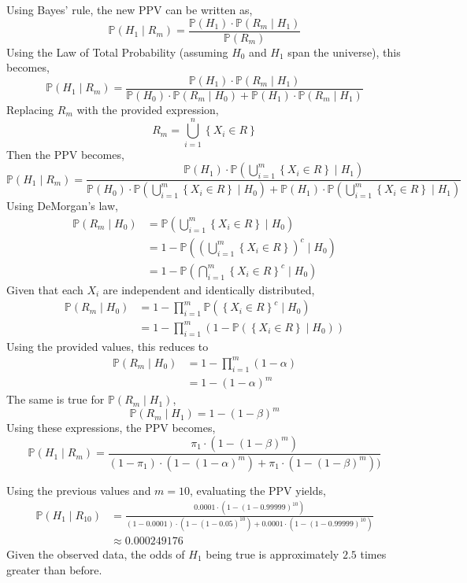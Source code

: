 \documentclass[12pt,twoside]{article}
\begin{document}
\begin{problems}
\begin{problemparts}
Using Bayes' rule, the new PPV can be written as,
$$ \mathbb{P}(H_1 \mid R_m) = \frac{\mathbb{P}(H_1) \cdot \mathbb{P}(R_m \mid
H_1)}{\mathbb{P}(R_m)} $$
Using the Law of Total Probability (assuming $H_0$ and $H_1$ span the
universe), this becomes,
$$ \mathbb{P}(H_1 \mid R_m) = \frac{\mathbb{P}(H_1) \cdot \mathbb{P}(R_m \mid
H_1)}{\mathbb{P}(H_0) \cdot \mathbb{P}(R_m \mid H_0) + \mathbb{P}(H_1) \cdot
\mathbb{P}(R_m \mid H_1)} $$
Replacing $R_m$ with the provided expression,
$$ R_m = \bigcup_{i = 1}^n \left\{X_i \in R\right\} $$
Then the PPV becomes,
$$ \mathbb{P}(H_1 \mid R_m) = \frac{\mathbb{P}(H_1) \cdot
\mathbb{P}(\bigcup_{i = 1}^m \left\{X_i \in R\right\} \mid
H_1)}{\mathbb{P}(H_0) \cdot \mathbb{P}(\bigcup_{i = 1}^m \left\{X_i \in
R\right\} \mid H_0) + \mathbb{P}(H_1) \cdot \mathbb{P}(\bigcup_{i = 1}^m
\left\{X_i \in R\right\} \mid H_1)} $$
Using DeMorgan's law, 
\begin{align*}
    \mathbb{P}\left(R_m \mid H_0\right) &= \mathbb{P}\left(\bigcup_{i = 1}^m
    \left\{X_i \in R\right\} \mid H_0\right) \\
    &= 1 - \mathbb{P}\left(\left(\bigcup_{i = 1}^m \left\{X_i \in
    R\right\}\right)^c \mid H_0\right) \\
    &= 1 - \mathbb{P}\left(\bigcap_{i = 1}^m \left\{X_i \in R\right\}^c \mid
    H_0\right)
\end{align*}
Given that each $X_i$ are independent and identically distributed, 
\begin{align*}
    \mathbb{P}\left(R_m \mid H_0\right) &= 1 - \prod_{i = 1}^m
    \mathbb{P}\left(\left\{X_i \in R\right\}^c \mid H_0\right) \\
    &= 1 - \prod_{i = 1}^m \left(1 - \mathbb{P}\left(\left\{X_i \in R\right\}
    \mid H_0\right)\right)
\end{align*}
Using the provided values, this reduces to
\begin{align*}
    \mathbb{P}\left(R_m \mid H_0\right) &= 1 - \prod_{i = 1}^m \left(1 -
    \alpha\right) \\
    &= 1 - (1 - \alpha)^m
\end{align*}
The same is true for $\mathbb{P}(R_m \mid H_1)$,
$$ \mathbb{P}(R_m \mid H_1) = 1 - (1 - \beta)^m $$
Using these expressions, the PPV becomes,
$$ \mathbb{P}(H_1 \mid R_m) = \boxed{\frac{\pi_1 \cdot \left(1 - (1 -
\beta)^m\right)}{(1 - \pi_1) \cdot \left(1 - (1 - \alpha)^m\right) + \pi_1
\cdot \left(1 - (1 - \beta)^m\right))}} $$

\problempart  %

Using the previous values and $m = 10$, evaluating the PPV yields,
\begin{align*}
    \mathbb{P}(H_1 \mid R_{10}) &= \frac{0.0001 \cdot (1 - (1 -
    0.99999)^{10})}{(1 - 0.0001) \cdot (1 - (1 - 0.05)^{10}) + 0.0001 \cdot
    (1 - (1 - 0.99999)^{10})} \\
    &\approx \boxed{0.000249176}
\end{align*}
Given the observed data, the odds of $H_1$ being true is approximately $2.5$
times greater than before.


\end{problemparts}
\end{problems}
\end{document}
